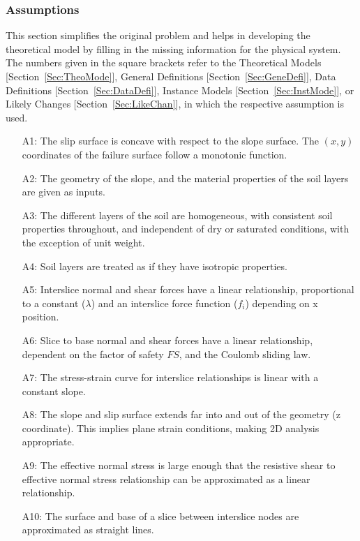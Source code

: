 \documentclass[12pt]{article}
\begin{document}
\subsubsection{Assumptions}
\label{Sec:Assu}
This section simplifies the original problem and helps in developing the theoretical model by filling in the missing information for the physical system. The numbers given in the square brackets refer to the Theoretical Models [Section~\ref{Sec:TheoMode}], General Definitions [Section~\ref{Sec:GeneDefi}], Data Definitions [Section~\ref{Sec:DataDefi}], Instance Models [Section~\ref{Sec:InstMode}], or Likely Changes [Section~\ref{Sec:LikeChan}], in which the respective assumption is used.
\begin{itemize}
\item[A1:]The slip surface is concave with respect to the slope surface. The $(x,y)$ coordinates of the failure surface follow a monotonic function.
\item[A2:]The geometry of the slope, and the material properties of the soil layers are given as inputs.
\item[A3:]The different layers of the soil are homogeneous, with consistent soil properties throughout, and independent of dry or saturated conditions, with the exception of unit weight.
\item[A4:]Soil layers are treated as if they have isotropic properties.
\item[A5:]Interslice normal and shear forces have a linear relationship, proportional to a constant ($\lambda{}$) and an interslice force function ($f_{i}$) depending on x position.
\item[A6:]Slice to base normal and shear forces have a linear relationship, dependent on the factor of safety $FS$, and the Coulomb sliding law.
\item[A7:]The stress-strain curve for interslice relationships is linear with a constant slope.
\item[A8:]The slope and slip surface extends far into and out of the geometry (z coordinate). This implies plane strain conditions, making 2D analysis appropriate.
\item[A9:]The effective normal stress is large enough that the resistive shear to effective normal stress relationship can be approximated as a linear relationship.
\item[A10:]The surface and base of a slice between interslice nodes are approximated as straight lines.
\end{itemize}
\end{document}
